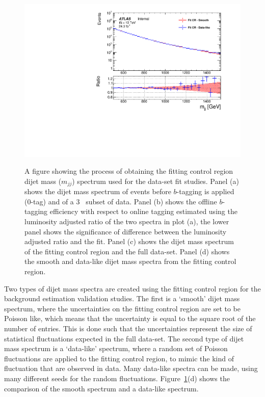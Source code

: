 \begin{figure}[!htb]
{}\hspace{-8mm}
\subcaptionbox{} { \includegraphics[width=0.51\linewidth, angle=0]{figs/Dibjet/LowMass/FitStudy/corrFitCR_smooth_dataLike.pdf}\vspace{-1mm}
}
\hspace{-2mm}

\caption{\label{fig:fittingCR}
  A figure showing the process of obtaining the \lm{} fitting control region dijet mass ($m_{jj}$) spectrum
  used for the \lm{} data-set fit studies.
  Panel (a) shows the dijet mass spectrum of events before $b$-tagging is applied (0-tag) and of a 3~\ifb{} subset of \lm{} data.
  Panel (b) shows the offline $b$-tagging efficiency with respect to online tagging estimated using the luminosity adjusted ratio of the two spectra in plot (a),
  the lower panel shows the significance of difference between the luminosity adjusted ratio and the fit.
  Panel (c) shows the dijet mass spectrum of the fitting control region and the full \lm{} data-set.
  Panel (d) shows the smooth and data-like dijet mass spectra from the fitting control region.
}
\end{figure}

Two types of dijet mass spectra are created using the fitting control region for the background estimation validation studies.
The first is a `smooth' dijet mass spectrum, where the uncertainties on the fitting control region are set to be Poisson like,
which means that the uncertainty is equal to the square root of the number of entries.
This is done such that the uncertainties represent the size of statistical fluctuations expected in the full \lm{} data-set.
The second type of dijet mass spectrum is a `data-like' spectrum,
where a random set of Poisson fluctuations are applied to the fitting control region,
to mimic the kind of fluctuation that are observed in data.
Many data-like spectra can be made, using many different seeds for the random fluctuations.
Figure~\ref{fig:fittingCR}(d) shows the comparison of the smooth spectrum and a data-like spectrum.

